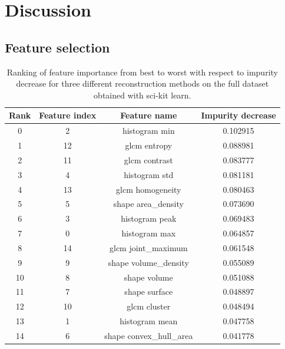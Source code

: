 \section{Discussion} \label{sec:discussion} 

\subsection{Feature selection}


\begin{table}[H]
    \centering
    \caption{Ranking of feature importance from best to worst with respect to
    impurity decrease for three different reconstruction methods on the full
    dataset obtained with sci-kit learn.}  
    \label{tab:feature_importance}  

    \begin{tabular}{|c|c|c|c|}
        \hline
        Rank & Feature index & Feature name & Impurity decrease \\     
        \hline
        0       & 2           & histogram min  & 0.102915  \\
        1      & 12            & glcm entropy  & 0.088981  \\
        2      & 11           & glcm contrast  & 0.083777  \\
        3       & 4           & histogram std  & 0.081181  \\
        4      & 13        & glcm homogeneity  & 0.080463  \\
        5       & 5      & shape area\_density  & 0.073690  \\
        6       & 3          & histogram peak  & 0.069483  \\
        7       & 0           & histogram max  & 0.064857  \\
        8      & 14      & glcm joint\_maximum  & 0.061548  \\
        9       & 9    & shape volume\_density  & 0.055089  \\
        10      & 8            & shape volume  & 0.051088  \\
        11      & 7           & shape surface  & 0.048897  \\
        12     & 10            & glcm cluster  & 0.048494  \\
        13      & 1          & histogram mean  & 0.047758  \\
        14      & 6  & shape convex\_hull\_area  & 0.041778  \\
        \hline
         
    \end{tabular} 
\end{table}


